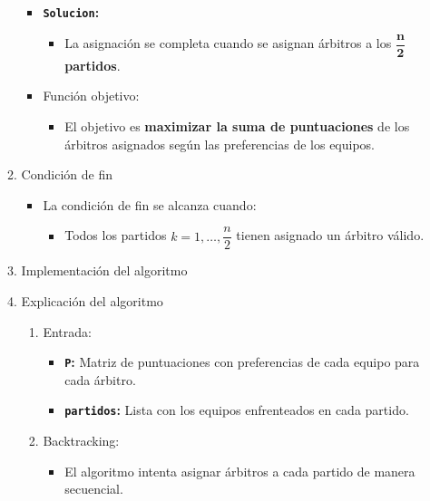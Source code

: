 \begin{enumerate}[label=\color{red}\textbf{\arabic*)}]
\begin{enumerate}[label=\arabic*)]
\begin{itemize}[label=\textbullet]
\begin{itemize}[label=\textbullet]
\begin{enumerate}[label=\arabic*)]
              \end{enumerate}
          \end{itemize}
        \item \textbf{\texttt{Solucion}:}
          \begin{itemize}[label=\textbullet]
            \item La asignación se completa cuando se asignan árbitros a los \textbf{$\mathbf{\dfrac{n}{2}}$ partidos}. 
          \end{itemize}
        \item Función objetivo:
          \begin{itemize}[label=\textbullet]
            \item El objetivo es \textbf{maximizar la suma de puntuaciones} de los árbitros asignados según las preferencias de los equipos.
          \end{itemize}
      \end{itemize}
    \item Condición de fin
      \begin{itemize}[label=\textbullet]
        \item La condición de fin se alcanza cuando:
          \begin{itemize}[label=\textbullet]
            \item Todos los partidos $k=1,\dots,\dfrac{n}{2}$ tienen asignado un árbitro válido.
          \end{itemize}
      \end{itemize}
    \item Implementación del algoritmo
      
    \item Explicación del algoritmo
      \begin{enumerate}[label=\arabic*)]
        \item Entrada:
          \begin{itemize}[label=\textbullet]
            \item \textbf{\texttt{P}:} Matriz de puntuaciones con preferencias de cada equipo para cada árbitro.
            \item \textbf{\texttt{partidos}:} Lista con los equipos enfrenteados en cada partido. 
          \end{itemize}
        \item Backtracking:
          \begin{itemize}[label=\textbullet]
            \item El algoritmo intenta asignar árbitros a cada partido de manera secuencial.

\end{itemize}
\end{enumerate}
\end{enumerate}
\end{enumerate}
